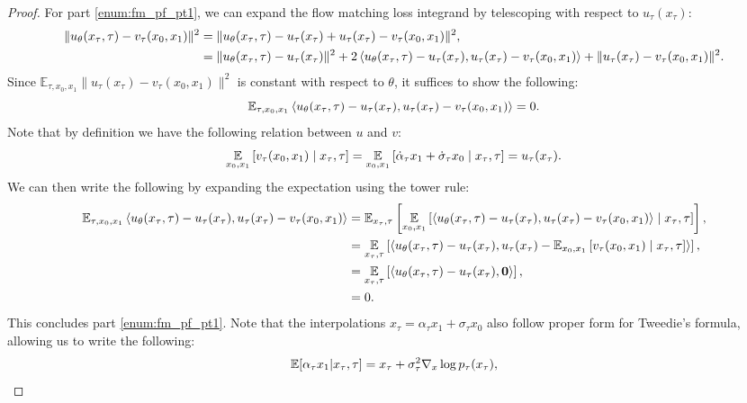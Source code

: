 \begin{proof}
For part \ref{enum:fm_pf_pt1}, we can expand the flow matching loss integrand by telescoping with respect to $u_\tau(x_\tau)$:
\begin{align}
    \|u_\theta(x_\tau, \tau) -  v_\tau(x_0, x_1)\|^2 &= \|u_\theta(x_\tau, \tau)  - u_\tau(x_\tau) + u_\tau(x_\tau) - v_\tau(x_0, x_1)\|^2,\\
    &= \|u_\theta(x_\tau, \tau) - u_\tau(x_\tau)\|^2 + 2\left\langle u_\theta(x_\tau, \tau)  - u_\tau(x_\tau),  u_\tau(x_\tau) -  v_\tau(x_0, x_1) \right\rangle + \|u_\tau(x_\tau) -  v_\tau(x_0, x_1)\|^2.
\end{align}
Since $\mathbb{E}_{\tau, x_0, x_1}\|u_\tau(x_\tau) -  v_\tau(x_0, x_1)\|^2$ is constant with respect to $\theta$, it suffices to show the following:
\begin{equation}
    \mathbb{E}_{\tau, x_0, x_1}\left\langle u_\theta(x_\tau, \tau)  - u_\tau(x_\tau),  u_\tau(x_\tau) -  v_\tau(x_0, x_1) \right\rangle = 0.
\end{equation}
Note that by definition we have the following relation between $u$ and $v$:
\begin{equation}
\E_{x_0, x_1} \left[ v_\tau(x_0, x_1) \mid x_\tau, \tau\right] = \E_{x_0, x_1} \left[ \dot \alpha_\tau x_1 + \dot \sigma_\tau x_0 \mid x_\tau, \tau\right] = u_\tau(x_\tau).
\end{equation}
We can then write the following by expanding the expectation using the tower rule:
\begin{align}
    \mathbb{E}_{\tau, x_0, x_1}\inner{u_\theta(x_\tau, \tau)  - u_\tau(x_\tau)}{ u_\tau(x_\tau) -  v_\tau(x_0, x_1)} &= \mathbb{E}_{x_\tau, \tau} \left[\E_{x_0, x_1}\left[\inner{u_\theta(x_\tau, \tau)  - u_\tau(x_\tau)}{ u_\tau(x_\tau) -  v_\tau(x_0, x_1)} \mid x_\tau, \tau\right]\right],\\
    &= \E_{x_\tau, \tau}\left[\inner{u_\theta(x_\tau, \tau)  - u_\tau(x_\tau)}{ u_\tau(x_\tau) -   \mathbb{E}_{x_0, x_1} \left[v_\tau(x_0, x_1)\mid x_\tau, \tau\right]} \right],\\
    &= \E_{x_\tau,\tau}\left[\inner{u_\theta(x_\tau, \tau)  - u_\tau(x_\tau)}{ \mb 0} \right],\\
    &= 0.
\end{align}
This concludes part \ref{enum:fm_pf_pt1}. Note that the interpolations $x_\tau = \alpha_\tau x_1 + \sigma_\tau x_0$ also follow proper form for Tweedie's formula, allowing us to write the following:
\begin{align}
    \E[\alpha_\tau x_1 | x_\tau, \tau] &= x_\tau + \sigma_\tau^2 \nabla_{x} \log p_\tau (x_\tau),\\

\end{align}
\end{proof}
